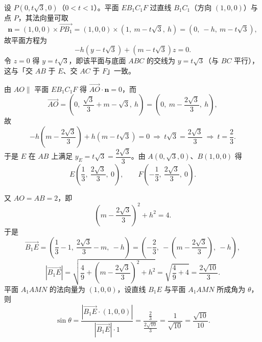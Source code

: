 \begin{answer}
设 $P(0,t\sqrt3,0)$（$0<t<1$）。平面 $EB_1C_1F$ 过直线 $B_1C_1$（方向 $(1,0,0)$）与点 $P$，其法向量可取
\nopagebreak[4]
\[\boldsymbol n=(1,0,0)\times\overrightarrow{PB_1}=(1,0,0)\times(1,\ m-t\sqrt3,\ h)=\left(0,\ -h,\ m-t\sqrt3\right),\]
故平面方程为
\nopagebreak[4]
\[-h\left(y-t\sqrt3\right)+\left(m-t\sqrt3\right)z=0 .\]
令 $z=0$ 得 $y=t\sqrt3$，即该平面与底面 $ABC$ 的交线为 $y=t\sqrt3$（与 $BC$ 平行），这与「交 $AB$ 于 $E$、交 $AC$ 于 $F$」一致。

由 $AO\parallel$ 平面 $EB_1C_1F$ 得 $\overrightarrow{AO}\cdot\boldsymbol n=0$，而
\nopagebreak[4]
\[\overrightarrow{AO}=\left(0,\ \frac{\sqrt3}3+m-\sqrt3,\ h\right)=\left(0,\ m-\frac{2\sqrt3}3,\ h\right),\]
故
\nopagebreak[4]
\[-h\left(m-\frac{2\sqrt3}3\right)+h\left(m-t\sqrt3\right)=0\ \Longrightarrow\ t\sqrt3=\frac{2\sqrt3}3\ \Longrightarrow\ t=\frac23 .\]
于是 $E$ 在 $AB$ 上满足 $y_E=t\sqrt3=\dfrac{2\sqrt3}3$。由 $A(0,\sqrt3,0)$、$B(1,0,0)$ 得
\nopagebreak[4]
\[E\left(\frac13,\ \frac{2\sqrt3}3,\ 0\right),\qquad F\left(-\frac13,\ \frac{2\sqrt3}3,\ 0\right).\]

又 $AO=AB=2$，即
\nopagebreak[4]
\[\left(m-\frac{2\sqrt3}3\right)^2+h^2=4 .\]
于是
\nopagebreak[4]
\[\overrightarrow{B_1E}=\left(\frac13-1,\ \frac{2\sqrt3}3-m,\ -h\right)=\left(-\frac23,\ -\left(m-\frac{2\sqrt3}3\right),\ -h\right),\]
\nopagebreak[4]
\[|\overrightarrow{B_1E}|=\sqrt{\frac49+\left(m-\frac{2\sqrt3}3\right)^2+h^2}=\sqrt{\frac49+4}=\frac{2\sqrt{10}}3 .\]
平面 $A_1AMN$ 的法向量为 $(1,0,0)$，设直线 $B_1E$ 与平面 $A_1AMN$ 所成角为 $\theta$，则
\nopagebreak[4]
\[\sin\theta=\frac{\left|\overrightarrow{B_1E}\cdot(1,0,0)\right|}{|\overrightarrow{B_1E}|\cdot1}
=\frac{\frac23}{\frac{2\sqrt{10}}3}=\frac1{\sqrt{10}}=\frac{\sqrt{10}}{10} .\]



\end{answer}
